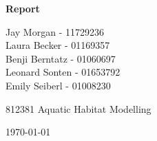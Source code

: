 \begin{titlepage}


\begin{center}                                          %
    \vspace*{3cm}                                           %

    \LARGE                                                  %
    \textbf{{Report}}

    \vspace{0.5cm}                                          %

    \vspace{1.5cm}                                          %

    \Large                                                  %
    
    
    Jay Morgan - 11729236\\
    Laura Becker - 01169357\\
    Benji Berntatz - 01060697\\
    Leonard Sonten - 01653792\\
    Emily Seiberl - 01008230\\
    \vspace{3cm}                                            %

    812381 Aquatic Habitat Modelling
    \vspace{.5cm}                                           %

    \today                                                  %
    \vfill                                                  %


\end{center}
\end{titlepage}
